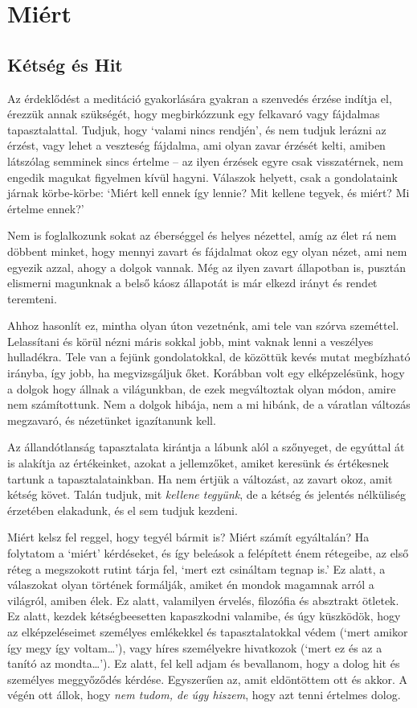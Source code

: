 \chapter{Miért}

\section{Kétség és Hit}

Az érdeklődést a meditáció gyakorlására gyakran a szenvedés érzése
indítja el, érezzük annak szükségét, hogy megbirkózzunk egy felkavaró
vagy fájdalmas tapasztalattal. Tudjuk, hogy `valami nincs rendjén', és
nem tudjuk lerázni az érzést, vagy lehet a veszteség fájdalma, ami olyan
zavar érzését kelti, amiben látszólag semminek sincs értelme -- az ilyen
érzések egyre csak visszatérnek, nem engedik magukat figyelmen kívül
hagyni. Válaszok helyett, csak a gondolataink járnak körbe-körbe: `Miért
kell ennek így lennie? Mit kellene tegyek, és miért? Mi értelme ennek?'

Nem is foglalkozunk sokat az éberséggel és helyes nézettel, amíg az élet
rá nem döbbent minket, hogy mennyi zavart és fájdalmat okoz egy olyan
nézet, ami nem egyezik azzal, ahogy a dolgok vannak. Még az ilyen zavart
állapotban is, pusztán elismerni magunknak a belső káosz állapotát is
már elkezd irányt és rendet teremteni.

Ahhoz hasonlít ez, mintha olyan úton vezetnénk, ami tele van szórva
szeméttel. Lelassítani és körül nézni máris sokkal jobb, mint vaknak
lenni a veszélyes hulladékra. Tele van a fejünk gondolatokkal, de
közöttük kevés mutat megbízható irányba, így jobb, ha megvizsgáljuk
őket. Korábban volt egy elképzelésünk, hogy a dolgok hogy állnak a
világunkban, de ezek megváltoztak olyan módon, amire nem számítottunk.
Nem a dolgok hibája, nem a mi hibánk, de a váratlan változás megzavaró,
és nézetünket igazítanunk kell.

Az állandótlanság tapasztalata kirántja a lábunk alól a szőnyeget, de
egyúttal át is alakítja az értékeinket, azokat a jellemzőket, amiket
keresünk és értékesnek tartunk a tapasztalatainkban. Ha nem értjük a
változást, az zavart okoz, amit kétség követ. Talán tudjuk, mit
\emph{kellene tegyünk}, de a kétség és jelentés nélküliség érzetében
elakadunk, és el sem tudjuk kezdeni.

Miért kelsz fel reggel, hogy tegyél bármit is? Miért számít egyáltalán?
Ha folytatom a `miért' kérdéseket, és így beleások a felépített énem
rétegeibe, az első réteg a megszokott rutint tárja fel, `mert ezt
csináltam tegnap is.' Ez alatt, a válaszokat olyan történek formálják,
amiket én mondok magamnak arról a világról, amiben élek. Ez alatt,
valamilyen érvelés, filozófia és absztrakt ötletek. Ez alatt, kezdek
kétségbeesetten kapaszkodni valamibe, és úgy küszködök, hogy az
elképzeléseimet személyes emlékekkel és tapasztalatokkal védem (`mert
amikor így megy így voltam\ldots{}'), vagy híres személyekre hivatkozok
(`mert ez és az a tanító az mondta\ldots{}'). Ez alatt, fel kell adjam
és bevallanom, hogy a dolog hit és személyes meggyőződés kérdése.
Egyszerűen az, amit eldöntöttem ott és akkor. A végén ott állok, hogy
\emph{nem tudom, de úgy hiszem}, hogy azt tenni értelmes dolog.

